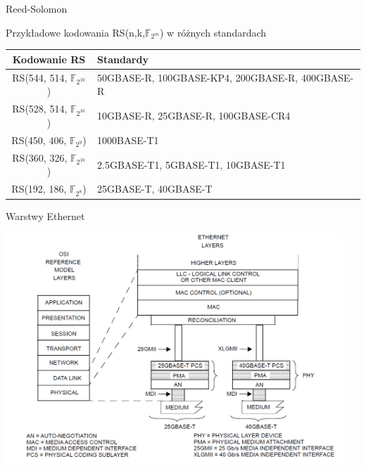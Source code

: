 \documentclass{beamer}
\begin{document}
\begin{frame}{Reed-Solomon}
	\begin{exampleblock}{Przykładowe kodowania RS(n,k,$\mathbb{F}_{2^m}$)
		w różnych standardach}
		\begingroup
			\begin{table}[h]
			\centering
				\begin{tabular}{c p{6cm}}
				\toprule
				Kodowanie RS & Standardy \\
				\midrule
				RS(544, 514, $\mathbb{F}_{2^{10}}$)  & 50GBASE-R, 100GBASE-KP4, 200GBASE-R, 400GBASE-R \\
				\midrule
				RS(528, 514, $\mathbb{F}_{2^{10}}$) & 10GBASE-R, 25GBASE-R, 100GBASE-CR4 \\
				\midrule
				RS(450, 406, $\mathbb{F}_{2^9}$)  & 1000BASE-T1 \\
				\midrule
				RS(360, 326, $\mathbb{F}_{2^{10}}$)  & 2.5GBASE-T1, 5GBASE-T1, 10GBASE-T1 \\
				\midrule
				RS(192, 186, $\mathbb{F}_{2^8}$)  & 25GBASE-T, 40GBASE-T \\
				\bottomrule
				\end{tabular}
			\end{table}
		\endgroup
	\end{exampleblock}
\end{frame}

\begin{frame}{Warstwy Ethernet}
	\begin{center}
        \includegraphics[width=0.95\textwidth,height=0.85\textheight,keepaspectratio]{images/25-40-gbase-osi.png}
    \end{center}
\end{frame}
\end{document}

